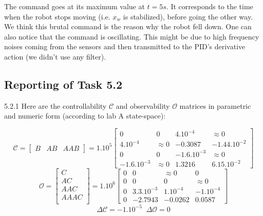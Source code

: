 \documentclass[11pt]{article}
\begin{document}
The command goes at its maximum value at $t=5 s$. It corresponds to the time when the robot stops moving (i.e. $x_w$ is stabilized), before going the other way. We think this brutal command is the reason why the robot fell down.
One can also notice that the command is oscillating. This might be due to high frequency noises coming from the sensors and then transmitted to the PID's derivative action (we didn't use any filter).

\subsection*{Reporting of Task 5.2}

5.2.1 Here are the controllability $\mathcal{C}$ and observability $\mathcal{O}$ matrices in parametric and numeric form (according to lab A state-space):

\begin{equation*}
\mathcal{C}=
	\begin{bmatrix}
	B & AB & AAB
	\end{bmatrix}
	=1.10^5
	\begin{bmatrix}
	0 & 0 & 4.10^{-4} & \approx0 \\
	4.10^{-4} & \approx0 & -0.3087 & -1.44.10^{-2} \\
	0 & 0 & -1.6.10^{-3} & \approx0 \\
	-1.6.10^{-3} & \approx0 & 1.3216 & 6.15.10^{-2}
	\end{bmatrix}
\end{equation*}
\begin{equation*}
\mathcal{O}=
	\begin{bmatrix}
	C \\
	AC \\
	AAC \\
	AAAC \\
	\end{bmatrix}
	=1.10^6
	\begin{bmatrix}
	0 & 0 & \approx0 & 0 \\
	0 & 0 & 0 & \approx0 \\
	0 & 3.3.10^{-3} & 1.10^{-4} & -1.10^{-4} \\
	0 & -2.7943 & -0.0262 & 0.0587
	\end{bmatrix}
\end{equation*}
\begin{equation*}
\Delta\mathcal{C}=-1.10^{-5} \;\; \Delta\mathcal{O}=0
\end{equation*}
\end{document}
